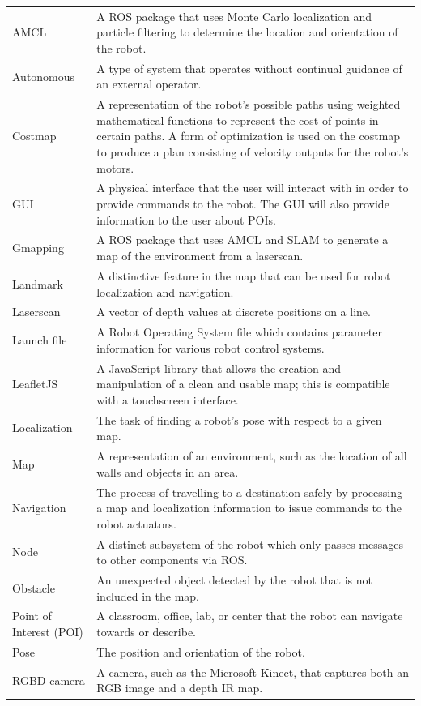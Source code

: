 \documentclass[11pt]{report}
\begin{document}
\begin{longtable}{p{3cm}p{9.9cm}}
\endlastfoot
AMCL&A ROS package that uses Monte Carlo localization and particle filtering to determine the location and orientation of the robot. \\
Autonomous&A type of system that operates without continual guidance of an external operator.\\
Costmap&A representation of the robot’s possible paths using weighted mathematical functions to represent the cost of points in certain paths. A form of optimization is used on the costmap to produce a plan consisting of velocity outputs for the robot’s motors.\\
GUI&A physical interface that the user will interact with in order to provide commands to the robot. The GUI will also provide information to the user about POIs.\\
Gmapping&A ROS package that uses AMCL and SLAM to generate a map of the environment from a laserscan.\\
Landmark&A distinctive feature in the map that can be used for robot localization and navigation. \\
Laserscan&A vector of depth values at discrete positions on a line.\\
Launch file&A Robot Operating System file which contains parameter information for various robot control systems.\\
LeafletJS&A JavaScript library that allows the creation and manipulation of a clean and usable map; this is compatible with a touchscreen interface.\\
Localization&The task of finding a robot’s pose with respect to a given map.\\
Map&A representation of an environment, such as the location of all walls and objects in an area.\\
Navigation&The process of travelling to a destination safely by processing a map and localization information to issue commands to the robot actuators.\\
Node&A distinct subsystem of the robot which only passes messages to other components via ROS.\\
Obstacle&An unexpected object detected by the robot that is not included in the map.\\
Point of Interest (POI)&A classroom, office, lab, or center that the robot can navigate towards or describe.\\
Pose&The position and orientation of the robot.\\
RGBD camera&A camera, such as the Microsoft Kinect, that captures both an RGB image and a depth IR map.\\

\end{longtable}
\end{document}
